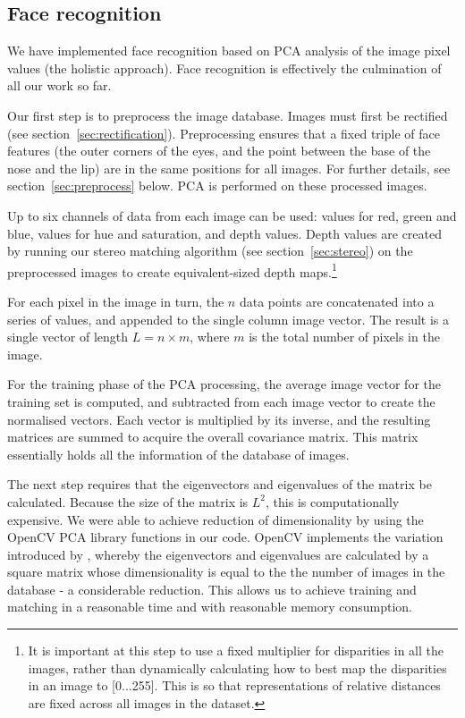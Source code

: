 
\subsection{Face recognition}
\label{sec:face-rec}
We have implemented face recognition based on PCA analysis of the image pixel
values (the holistic approach). Face recognition is effectively the culmination of all our work so far.

Our first step is to preprocess the image database. Images must first be rectified (see section~\ref{sec:rectification}). Preprocessing ensures that a fixed triple of face features (the outer corners of the eyes, and the point between the base of the nose and the lip) are in the same positions for all images. For further details, see section~\ref{sec:preprocess} below. PCA is performed on these processed images.

Up to six channels of data from each image can be used: values for red, green and blue, values for hue and saturation, and depth values. Depth values are created by running our stereo matching algorithm (see section~\ref{sec:stereo}) on the preprocessed images to create equivalent-sized depth maps.\footnote{ It is important at this step to use a fixed multiplier for disparities in all the images, rather than dynamically calculating how to best map the disparities in an image to [0...255]. This is so that representations of relative distances are fixed across all images in the dataset.}

For each pixel in the image in turn, the $n$ data points are concatenated into a series of values, and appended to the single column image vector. The result is a single vector of length $L = n \times m$, where $m$ is the total number of pixels in the image.

For the training phase of the PCA processing, the average image vector for the
training set is computed, and subtracted from each image vector to create the normalised vectors. Each vector is multiplied by its inverse, and the resulting matrices are summed to acquire the overall covariance matrix. This matrix essentially holds all the information of the database of images.

The next step requires that the eigenvectors and eigenvalues of the matrix be calculated. Because the size of the matrix is $L^{2}$, this is computationally expensive. We were able to achieve reduction of dimensionality by using the OpenCV PCA library functions in our code. OpenCV implements the variation introduced by \citet{turk_pentland}, whereby the eigenvectors and eigenvalues are calculated by a square matrix whose dimensionality is equal to the the number of images in the database - a considerable reduction. This allows us to achieve training and matching in a reasonable time and with reasonable memory consumption.

